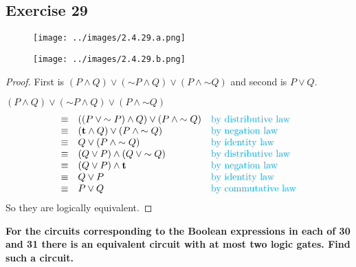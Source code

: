 \documentclass[14pt]{extarticle}
\newcommand{\true}{{\bf t}}
\begin{document}
\subsection{Exercise 29}
\begin{figure}[ht!]
    \centering
    \texttt{[image: ../images/2.4.29.a.png]}
\end{figure}

\begin{figure}[ht!]
    \centering
    \texttt{[image: ../images/2.4.29.b.png]}
\end{figure}

\begin{proof}
    First is $(P \wedge Q) \vee ({\sim P} \wedge Q) \vee (P \wedge {\sim Q})$ and second is $P \vee Q$.

    $(P \wedge Q) \vee ({\sim P} \wedge Q) \vee (P \wedge {\sim Q})$ $$
        \begin{array}{cll}
            \equiv           & ((P \vee {\sim P}) \wedge Q) \vee (P \wedge {\sim
            Q})              & \text{\color{cyan}by distributive law}                                                      \\
            \equiv           & (\true \wedge Q) \vee (P \wedge {\sim Q})         & \text{\color{cyan}by negation law}      \\ \equiv & Q \vee (P
            \wedge {\sim Q}) & \text{\color{cyan}by identity law}                                                          \\
            \equiv           & (Q \vee P) \wedge (Q \vee {\sim Q})               & \text{\color{cyan} by distributive law} \\
            \equiv           & (Q \vee P) \wedge \true                           & \text{\color{cyan}by negation law}      \\
            \equiv           & Q \vee P                                          & \text{\color{cyan}by identity law}      \\
            \equiv           & P \vee Q                                          & \text{\color{cyan}by commutative law}   \\
        \end{array}
    $$
    So they are logically equivalent.
\end{proof}

{\bf \color{cyan} For the circuits corresponding to the Boolean expressions in each of 30 and 31 there is an equivalent circuit with at most two logic gates. Find such a circuit.}
\end{document}

